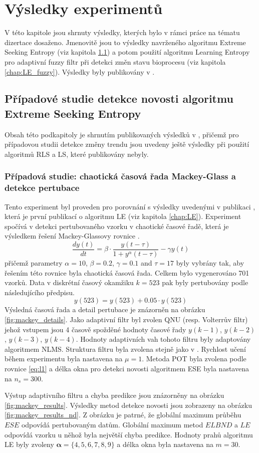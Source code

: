 \chapter{Výsledky experimentů}
V této kapitole jsou shrnuty výsledky, kterých bylo v rámci práce na tématu dizertace dosaženo. Jmenovitě jsou to výsledky navrženého algoritmu Extreme Seeking Entropy (viz kapitola \ref{chap: ESE_vysledky}) a potom použití algoritmu Learning Entropy pro adaptivní fuzzy filtr při detekci změn stavu bioprocesu (viz kapitola \ref{chap:LE_fuzzy}). Výsledky byly publikovány v \cite{ese_mdpi}.
\section{Případové studie detekce novosti algoritmu Extreme Seeking Entropy}\label{chap: ESE_vysledky}
Obsah této podkapitoly je shrnutím publikovaných výsledků v \cite{ese_mdpi}, přičemž pro případovou studii detekce změny trendu jsou uvedeny ještě výsledky při použití algoritmů RLS a LS, které publikovány nebyly.
\subsection{Případová studie: chaotická časová řada Mackey-Glass a detekce pertubace}
Tento experiment byl proveden pro porovnání s výsledky uvedenými v publikaci \cite{ivoLE1}, která je první publikací o algoritmu LE (viz kapitola \ref{chap:LE}). Experiment spočívá v detekci pertubovaného vzorku v chaotické časové řadě, která je výsledkem řešení Mackey-Glassovy rovnice \cite{mackey}.
\begin{equation}
    \frac{dy(t)}{dt}= \beta \cdot \frac{ y(t-\tau)}{1 + y^\alpha(t-\tau)} - \gamma y(t)
\end{equation}
přičemž parametry $\alpha = 10$, $\beta = 0.2$, $\gamma = 0.1$ and $\tau = 17$ byly vybrány tak, aby řešením této rovnice byla chaotická časová řada. Celkem bylo vygenerováno 701 vzorků. Data v diskrétní časový okamžiku $k=523$ pak byly pertubovány podle následujícího předpisu.
\begin{equation}
    y(523) = y(523) + 0.05 \cdot y(523)
\end{equation}
Výsledná časová řada a detail pertubace je znázorněn na obrázku \ref{fig:mackey_details}. Jako adaptivní filtr byl zvolen QNU (resp. Volterrův filtr) jehož vstupem jsou 4 časově spožděné hodnoty časové řady $y(k-1)$, $y(k-2)$, $y(k-3)$, $y(k-4)$. Hodnoty adaptivních vah tohoto filtru byly adaptovány algoritmem NLMS. Struktura filtru byla zvolena stejně jako v \cite{ivoLE1}. Rychlost učení během experimentu byla nastavena na $\mu=1$. Metoda POT byla zvolena podle rovnice \ref{eq:l1} a délka okna pro detekci novosti algoritmem ESE byla nastavena na $n_s=300$. 
\par 
Výstup adaptivního filtru a chyba predikce jsou znázorněny na obrázku \ref{fig:mackey_results}. Výsledky metod detekce novosti jsou zobrazeny na obrázku \ref{fig:mackey_results_nd}. Z obrázku je patrné, že globální maximum průběhu $ESE$ odpovídá pertubovaným datům. Globální maximum metod $ELBND$ a $LE$ odpovídá vzorku u něhož byla největší chyba predikce. Hodnoty prahů algoritmu LE byly zvoleny $\boldsymbol{\alpha}=\{4,5,6,7,8,9\}$ a délka okna byla nastavena na $m=30$.



